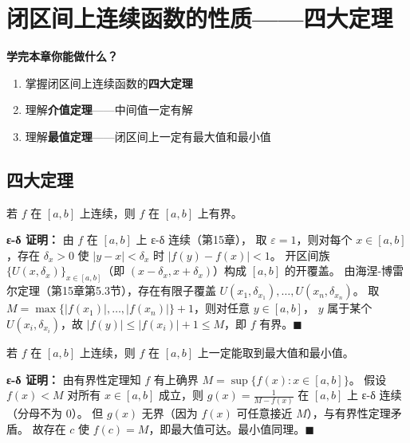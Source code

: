 
\chapter{闭区间上连续函数的性质——四大定理}

\begin{applicationbox}
\textbf{学完本章你能做什么？}
\begin{enumerate}
  \item 掌握闭区间上连续函数的\textbf{四大定理}
  \item 理解\textbf{介值定理}——中间值一定有解
  \item 理解\textbf{最值定理}——闭区间上一定有最大值和最小值
\end{enumerate}
\end{applicationbox}


\section{四大定理}

\begin{theorembox}[1. 有界性定理]
若 \(f\) 在 \([a,b]\) 上连续，则 \(f\) 在 \([a,b]\) 上有界。

\textbf{ε-δ 证明：} 由 \(f\) 在 \([a,b]\) 上 ε-δ 连续（第15章），
取 \(\varepsilon=1\)，则对每个 \(x\in[a,b]\)，存在 \(\delta_x>0\) 使
\(|y-x|<\delta_x\) 时 \(|f(y)-f(x)|<1\)。
开区间族 \(\{U(x,\delta_x)\}_{x\in[a,b]}\)（即 \((x-\delta_x,x+\delta_x)\)）构成 \([a,b]\) 的开覆盖。
由海涅-博雷尔定理（第15章第5.3节），存在有限子覆盖 \(U(x_1,\delta_{x_1}),\ldots,U(x_n,\delta_{x_n})\)。
取 \(M=\max\{|f(x_1)|,\ldots,|f(x_n)|\}+1\)，则对任意 \(y\in[a,b]\)，
\(y\) 属于某个 \(U(x_i,\delta_{x_i})\)，故 \(|f(y)|\le|f(x_i)|+1\le M\)，即 \(f\) 有界。\(\blacksquare\)
\end{theorembox}

\begin{theorembox}
若 \(f\) 在 \([a,b]\) 上连续，则 \(f\) 在 \([a,b]\) 上一定能取到最大值和最小值。

\textbf{ε-δ 证明：} 由有界性定理知 \(f\) 有上确界 \(M=\sup\{f(x):x\in[a,b]\}\)。
假设 \(f(x)<M\) 对所有 \(x\in[a,b]\) 成立，则 \(g(x)=\frac1{M-f(x)}\) 在 \([a,b]\) 上 ε-δ 连续（分母不为 0）。
但 \(g(x)\) 无界（因为 \(f(x)\) 可任意接近 \(M\)），与有界性定理矛盾。
故存在 \(c\) 使 \(f(c)=M\)，即最大值可达。最小值同理。\(\blacksquare\)
\end{theorembox}

